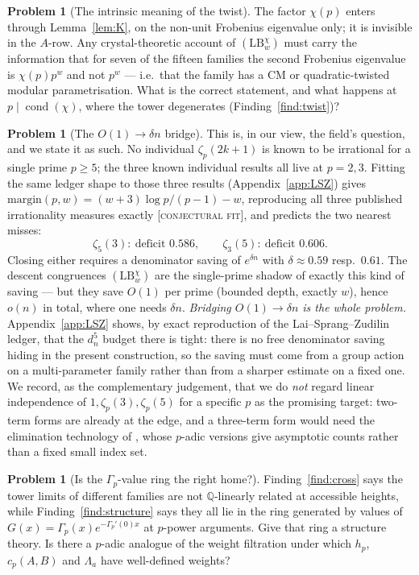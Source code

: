 \documentclass[11pt,reqno]{article}
\newcommand{\QQ}{\mathbb{Q}}
\newcommand{\Gp}{\Gamma_p}
\DeclareMathOperator{\cond}{cond}
\newcommand{\FIT}{{\normalfont\textsc{[conjectural fit]}}}
\theoremstyle{plain}
\theoremstyle{definition}
\newtheorem{problem}[theorem]{Problem}
\theoremstyle{remark}
\numberwithin{equation}{section}
\begin{document}
\begin{problem}[The intrinsic meaning of the twist]\label{prob:twist}
The factor $\chi(p)$ enters through Lemma~\ref{lem:K}, on the non-unit Frobenius
eigenvalue only; it is invisible in the $A$-row.  Any crystal-theoretic account
of $(\mathrm{LB}_w^\chi)$ must carry the information that for seven of the
fifteen families the second Frobenius eigenvalue is $\chi(p)p^{w}$ and not
$p^{w}$ --- i.e.\ that the family has a CM or quadratic-twisted modular
parametrisation.  What is the correct statement, and what happens at
$p\mid\cond(\chi)$, where the tower degenerates
(Finding~\ref{find:twist})?
\end{problem}

\begin{problem}[The $O(1)\to\delta n$ bridge]\label{prob:bridge}
This is, in our view, the field's question, and we state it as such.  No
individual $\zeta_p(2k+1)$ is known to be irrational for a single prime
$p\ge5$; the three known individual results all live at $p=2,3$.  Fitting the
same ledger shape to those three results (Appendix~\ref{app:LSZ}) gives
$\mathrm{margin}(p,w)=(w+3)\log p/(p-1)-w$, reproducing all three published
irrationality measures exactly \FIT, and predicts the two nearest misses:
\[
  \zeta_5(3):\ \text{deficit }0.586,\qquad
  \zeta_3(5):\ \text{deficit }0.606 .
\]
Closing either requires a denominator saving of $e^{\delta n}$ with
$\delta\approx0.59$ resp.\ $0.61$.  The descent congruences
$(\mathrm{LB}_w^\chi)$ are the single-prime shadow of exactly this kind of
saving --- but they save $O(1)$ per prime (bounded depth, exactly $w$), hence
$o(n)$ in total, where one needs $\delta n$.  \emph{Bridging $O(1)\to\delta n$ is
the whole problem.}  Appendix~\ref{app:LSZ} shows, by exact reproduction of the
Lai--Sprang--Zudilin ledger, that the $d_n^5$ budget there is tight: there is no
free denominator saving hiding in the present construction, so the saving must
come from a group action on a multi-parameter family
\cite{RhinViola} rather than from a sharper estimate on a fixed one.  We record, as the
complementary judgement, that we do \emph{not} regard linear independence of
$1,\zeta_p(3),\zeta_p(5)$ for a specific $p$ as the promising target: two-term
forms are already at the edge, and a three-term form would need the elimination
technology of \cite{FSZ2018,LaiSprang2023}, whose $p$-adic versions give
asymptotic counts rather than a fixed small index set.
\end{problem}

\begin{problem}[Is the $\Gp$-value ring the right home?]\label{prob:ring}
Finding~\ref{find:cross} says the tower limits of different families are not
$\QQ$-linearly related at accessible heights, while
Finding~\ref{find:structure} says they all lie in the ring generated by values
of $G(x)=\Gp(x)e^{-\Gp'(0)x}$ at $p$-power arguments.  Give that ring a
structure theory.  Is there a $p$-adic analogue of the weight filtration under
which $h_p$, $c_p(A,B)$ and $\Lambda_a$ have well-defined weights?
\end{problem}
\end{document}
